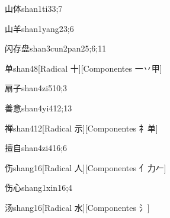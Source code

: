 \begin{verbete}{山体}{shan1ti3}{3;7}
\end{verbete}

\begin{verbete}{山羊}{shan1yang2}{3;6}
\end{verbete}

\begin{verbete}{闪存盘}{shan3cun2pan2}{5;6;11}
\end{verbete}

\begin{verbete}{单}{shan4}{8}[Radical 十][Componentes 一丷甲]
\end{verbete}

\begin{verbete}{扇子}{shan4zi5}{10;3}
\end{verbete}

\begin{verbete}{善意}{shan4yi4}{12;13}
\end{verbete}

\begin{verbete}{禅}{shan4}{12}[Radical 示][Componentes 礻单]
\end{verbete}

\begin{verbete}{擅自}{shan4zi4}{16;6}
\end{verbete}

\begin{verbete}{伤}{shang1}{6}[Radical 人][Componentes 亻力𠂉]
\end{verbete}

\begin{verbete}{伤心}{shang1xin1}{6;4}
\end{verbete}

\begin{verbete}{汤}{shang1}{6}[Radical 水][Componentes 氵]
\end{verbete}

